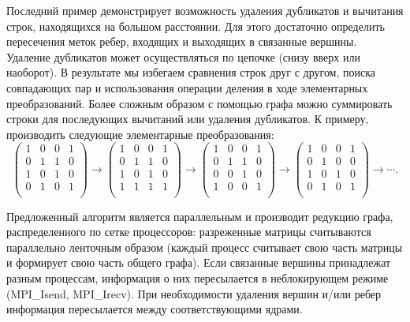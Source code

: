 Последний пример демонстрирует возможность удаления дубликатов и вычитания строк, находящихся на большом расстоянии. Для этого достаточно определить пересечения меток ребер, входящих и выходящих в связанные вершины. Удаление дубликатов может осуществляться по цепочке (снизу вверх или наоборот). В результате мы избегаем сравнения строк друг с другом, поиска совпадающих пар и использования операции деления в ходе элементарных преобразований. Более сложным образом с помощью графа можно
суммировать строки для последующих вычитаний или удаления дубликатов. К примеру, производить следующие элементарные преобразования:
\[
\begin{pmatrix}
	1 & 0 & 0 & 1\\
	0 & 1 & 1 & 0\\
	1 & 0 & 1 & 0\\
	0 & 1 & 0 & 1\\
\end{pmatrix}\rightarrow
\begin{pmatrix}
	1 & 0 & 0 & 1\\
	0 & 1 & 1 & 0\\
	1 & 0 & 1 & 0\\
	1 & 1 & 1 & 1\\
\end{pmatrix}
\rightarrow
\begin{pmatrix}
	1 & 0 & 0 & 1\\
	0 & 1 & 1 & 0\\
	0 & 0 & 1 & 0\\
	1 & 0 & 0 & 1\\
\end{pmatrix}
\rightarrow
\begin{pmatrix}
	1 & 0 & 0 & 1\\
	0 & 1 & 0 & 0\\
	1 & 0 & 1 & 0\\
	0 & 1 & 0 & 1\\
\end{pmatrix}\rightarrow\cdots.
\]

Предложенный алгоритм является параллельным и производит редукцию графа, распределенного по сетке процессоров: разреженные матрицы считываются параллельно ленточным образом (каждый процесс считывает свою часть матрицы и формирует свою часть общего графа). Если связанные вершины принадлежат разным процессам, информация о
них пересылается в неблокирующем режиме (MPI\_Isend, MPI\_Irecv). При необходимости удаления вершин и/или ребер информация пересылается между соответствующими
ядрами.

